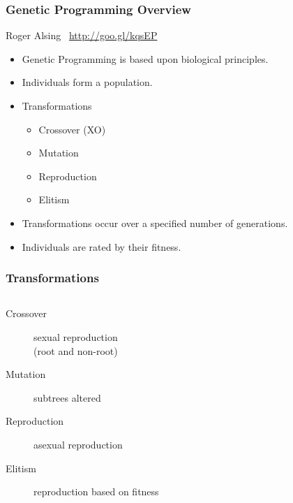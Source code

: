 \documentclass{beamer}
\begin{document}
\begin{frame}
  \frametitle{Genetic Programming Overview}
  \begin{center}
  \tiny{Roger Alsing \ \url{http://goo.gl/kqsEP} }

  \end{center}
 
  \begin{itemize}
  	\item Genetic Programming is based upon biological principles.
	\item Individuals form a population.
	\item Transformations
		\begin{itemize}
		\item Crossover (XO)
		\item Mutation
		\item Reproduction
		\item Elitism
		\end{itemize}
	\item Transformations occur over a specified number of generations.
	\item Individuals are rated by their fitness.
  \end{itemize}
\end{frame}

\begin{frame}
\frametitle{Transformations}
\begin{columns}
\begin{column}{0.55\textwidth}
{\footnotesize
		\begin{description}
		\item[Crossover] sexual reproduction \\ (root and non-root)
		\item[Mutation] subtrees altered
		\item[Reproduction] asexual reproduction
		\item[Elitism] reproduction based on fitness
		\end{description}
}
\end{column}
\begin{column}{0.45\textwidth}
\end{column}
\end{columns}
\vspace*{-0.5cm}
\begin{center}
\end{center}
\end{frame}
\end{document}
